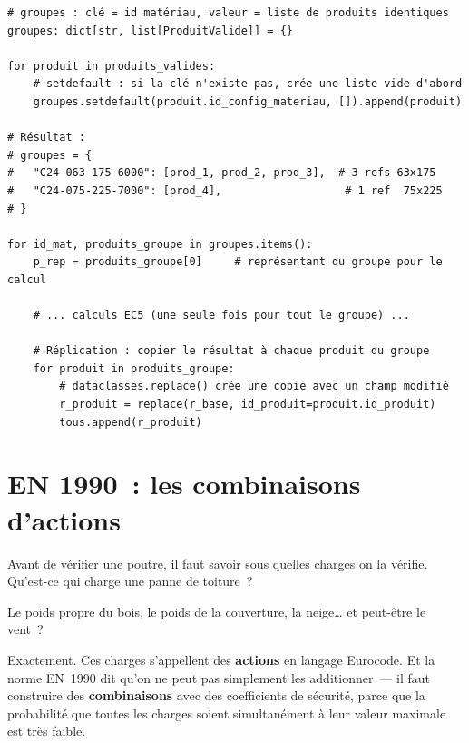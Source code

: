 \documentclass[12pt, a4paper, openany]{book}
\newcommand{\py}[1]{\texttt{#1}}
\newcommand{\fichier}[1]{\texttt{\textit{#1}}}
\begin{document}
\begin{lstlisting}[style=python, caption={Groupement par \py{id\_config\_materiau} --- extrait de \fichier{moteur.py}}]
# groupes : clé = id matériau, valeur = liste de produits identiques
groupes: dict[str, list[ProduitValide]] = {}

for produit in produits_valides:
    # setdefault : si la clé n'existe pas, crée une liste vide d'abord
    groupes.setdefault(produit.id_config_materiau, []).append(produit)

# Résultat :
# groupes = {
#   "C24-063-175-6000": [prod_1, prod_2, prod_3],  # 3 refs 63x175
#   "C24-075-225-7000": [prod_4],                   # 1 ref  75x225
# }

for id_mat, produits_groupe in groupes.items():
    p_rep = produits_groupe[0]     # représentant du groupe pour le calcul

    # ... calculs EC5 (une seule fois pour tout le groupe) ...

    # Réplication : copier le résultat à chaque produit du groupe
    for produit in produits_groupe:
        # dataclasses.replace() crée une copie avec un champ modifié
        r_produit = replace(r_base, id_produit=produit.id_produit)
        tous.append(r_produit)
\end{lstlisting}

\section{EN 1990~: les combinaisons d'actions}

\begin{maitre}
Avant de v\'erifier une poutre, il faut savoir sous quelles charges
on la v\'erifie. Qu'est-ce qui charge une panne de toiture~?
\end{maitre}

\begin{apprenti}
Le poids propre du bois, le poids de la couverture, la neige\ldots{}
et peut-\^etre le vent~?
\end{apprenti}

\begin{maitre}
Exactement. Ces charges s'appellent des \textbf{actions} en langage Eurocode.
Et la norme EN~1990 dit qu'on ne peut pas simplement les additionner~---
il faut construire des \textbf{combinaisons} avec des coefficients
de s\'ecurit\'e, parce que la probabilit\'e que toutes les charges
soient simultan\'ement \`a leur valeur maximale est tr\`es faible.
\end{maitre}
\end{document}
